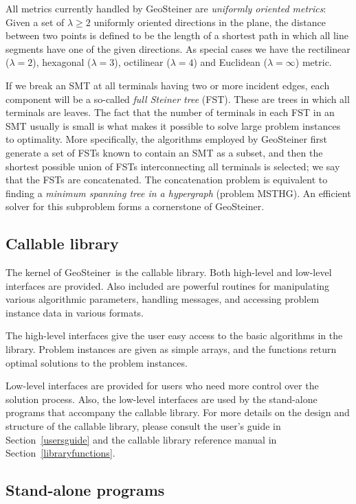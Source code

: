 \documentclass[12pt,twoside,letterpaper]{article}
\def\geosteiner{Geo\-Steiner}
\begin{document}
All metrics currently handled by \geosteiner{} are {\em uniformly
oriented metrics}: Given a set of $\lambda \geq 2$ uniformly oriented
directions in the plane, the distance between two points is defined to
be the length of a shortest path in which all line segments have one
of the given directions. As special cases we have the rectilinear
($\lambda=2$), hexagonal ($\lambda=3$), octilinear ($\lambda=4$) and
Euclidean ($\lambda=\infty$) metric.

If we break an SMT at all terminals having two or more incident
edges, each component will be a so-called {\em full Steiner tree}
(FST). These are trees in which all terminals are leaves. The fact
that the number of terminals in each FST in an SMT usually is small
is what makes it possible to solve large problem instances to
optimality. More specifically, the algorithms employed by
\geosteiner{} first generate a set of FSTs known to contain an SMT as
a subset, and then the shortest possible union of FSTs interconnecting
all terminals is selected; 
we say that the FSTs are concatenated. The concatenation problem is
equivalent to finding a {\em minimum spanning tree in a hypergraph}
(problem MSTHG).
An efficient solver for this subproblem forms a cornerstone of
\geosteiner.


\subsection{Callable library}
\label{intro_callable}

The kernel of \geosteiner\ is the callable library. Both high-level
and low-level interfaces are provided.  Also included are powerful
routines for manipulating various algorithmic parameters, handling
messages, and accessing problem instance data in various formats.

The high-level interfaces give the user easy access to the basic
algorithms in the library. Problem instances are given as simple
arrays, and the functions return optimal solutions to the problem 
instances. 

Low-level interfaces are provided for users who need more control
over the solution process. Also, the low-level
interfaces are used by the stand-alone programs that accompany the
callable library. For more details on the design and structure of the
callable library, please consult the user's guide in
Section~\ref{usersguide} and the callable library reference manual in
Section~\ref{libraryfunctions}.


\subsection{Stand-alone programs}
\label{intro_standalone}
\end{document}
